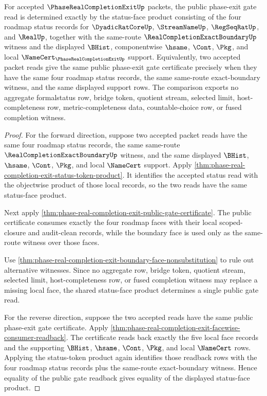 \begin{theorem}
\label{thm:phase-real-completion-exit-status-face-product-injectivity}
For accepted $\PhaseRealCompletionExitUp$ packets, the public phase-exit gate read is determined exactly by the status-face product consisting of the four roadmap status records for $\DyadicRatCoreUp$, $\StreamNameUp$, $\RegSeqRatUp$, and $\RealUp$, together with the same-route $\RealCompletionExactBoundaryUp$ witness and the displayed $\BHist$, componentwise $\hsame$, $\Cont$, $\Pkg$, and local $\NameCert_{\PhaseRealCompletionExitUp}$ support. Equivalently, two accepted packet reads give the same public phase-exit gate certificate precisely when they have the same four roadmap status records, the same same-route exact-boundary witness, and the same displayed support rows. The comparison exports no aggregate formalstatus row, bridge token, quotient stream, selected limit, host-completeness row, metric-completeness data, countable-choice row, or fused completion witness.
\end{theorem}
\begin{proof}
For the forward direction, suppose two accepted packet reads have the same four roadmap status records, the same same-route $\RealCompletionExactBoundaryUp$ witness, and the same displayed $\BHist$, $\hsame$, $\Cont$, $\Pkg$, and local $\NameCert$ support. Apply \autoref{thm:phase-real-completion-exit-status-token-product}. It identifies the accepted status read with the objectwise product of those local records, so the two reads have the same status-face product.

Next apply \autoref{thm:phase-real-completion-exit-public-gate-certificate}. The public certificate consumes exactly the four roadmap faces with their local scoped-closure and audit-clean records, while the boundary face is used only as the same-route witness over those faces.

Use \autoref{thm:phase-real-completion-exit-boundary-face-nonsubstitution} to rule out alternative witnesses. Since no aggregate row, bridge token, quotient stream, selected limit, host-completeness row, or fused completion witness may replace a missing local face, the shared status-face product determines a single public gate read.

For the reverse direction, suppose the two accepted reads have the same public phase-exit gate certificate. Apply \autoref{thm:phase-real-completion-exit-facewise-consumer-readback}. The certificate reads back exactly the five local face records and the supporting $\BHist$, $\hsame$, $\Cont$, $\Pkg$, and local $\NameCert$ rows. Applying the status-token product again identifies those readback rows with the four roadmap status records plus the same-route exact-boundary witness. Hence equality of the public gate readback gives equality of the displayed status-face product.
\end{proof}

